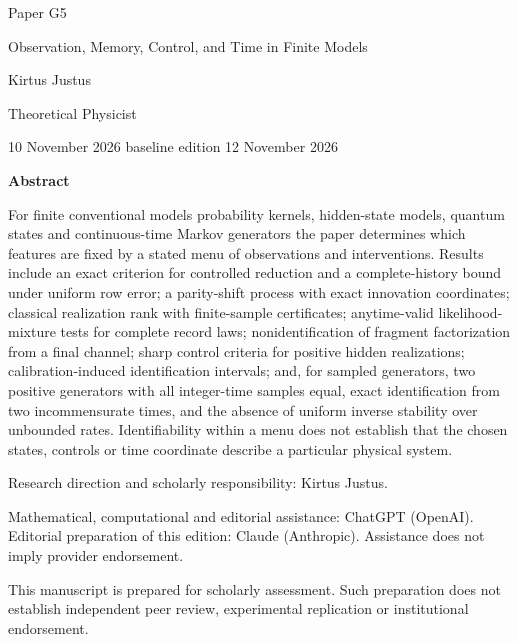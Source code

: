 \documentclass[11pt,a4paper]{article}
\begin{document}
\begin{titlepage}
{\small\sffamily \ProgramTitle\hfill Paper G5\par}
\vspace*{16mm}
{\LARGE\bfseries\raggedright{} Observation, Memory, Control, and Time in Finite Models\par}
\vspace{11mm}
{\large Kirtus Justus\par}
\vspace{1mm}
Theoretical Physicist\par
\AuthorLocation\par
\vspace{2mm}
10 November 2026 \textperiodcentered{} baseline edition 12 November 2026\par
\vspace{11mm}
\textbf{Abstract}\par
For finite conventional models \textemdash{} probability kernels, hidden-state models, quantum states and continuous-time Markov generators \textemdash{} the paper determines which features are fixed by a stated menu of observations and interventions. Results include an exact criterion for controlled reduction and a complete-history bound under uniform row error; a parity-shift process with exact innovation coordinates; classical realization rank with finite-sample certificates; anytime-valid likelihood-mixture tests for complete record laws; nonidentification of fragment factorization from a final channel; sharp control criteria for positive hidden realizations; calibration-induced identification intervals; and, for sampled generators, two positive generators with all integer-time samples equal, exact identification from two incommensurate times, and the absence of uniform inverse stability over unbounded rates. Identifiability within a menu does not establish that the chosen states, controls or time coordinate describe a particular physical system.\par
\vfill
{\small Research direction and scholarly responsibility: Kirtus Justus.\par
Mathematical, computational and editorial assistance: ChatGPT (OpenAI). Editorial preparation of this edition: Claude (Anthropic).
Assistance does not imply provider endorsement.\par
This manuscript is prepared for scholarly assessment. Such preparation does not establish independent peer review,
experimental replication or institutional endorsement.\par}
\end{titlepage}
\end{document}
